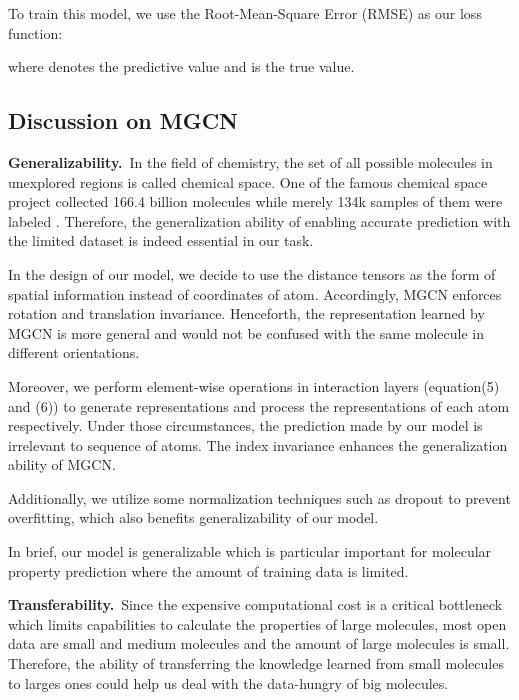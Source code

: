 \documentclass[letterpaper]{article} \usepackage{bm}
\begin{document}
 To train this model, we use the Root-Mean-Square Error (RMSE) as our loss function: 
      
 where  denotes the predictive value and  is the true value. 


\subsection{Discussion on MGCN} 

\textbf{Generalizability.}\   
In the field of chemistry, the set of all possible molecules in unexplored regions is called chemical space. One of the famous chemical space project \cite{Ruddigkeit2012EnumerationO1} collected 166.4 billion molecules while merely 134k samples of them were labeled \cite{ramakrishnan2015many}. Therefore, the generalization ability of enabling accurate prediction with the limited dataset is indeed essential in our task.

In the design of our model, we decide to use the distance tensors  as the form of spatial information instead of coordinates of atom. Accordingly, MGCN enforces rotation and translation invariance. Henceforth, the representation learned by MGCN is more general and would not be confused with the same molecule in different orientations.  

Moreover, we perform element-wise operations in interaction layers (equation(5) and (6)) to generate representations and process the representations of each atom  respectively. Under those circumstances, the prediction made by our model is irrelevant to sequence of atoms. The index invariance enhances the generalization ability of MGCN.

Additionally, we utilize some normalization techniques such as dropout to prevent overfitting, which also benefits generalizability of our model.

In brief, our model is generalizable which is particular important for molecular property prediction where the amount of training data is limited.

\textbf{Transferability.}\ Since the expensive computational cost is a critical bottleneck which limits capabilities to calculate the properties of large molecules, most open data are small and medium molecules and the amount of large molecules is small. Therefore, the ability of transferring the knowledge learned from small molecules to larges ones could help us deal with the data-hungry of big molecules.  
\end{document}
